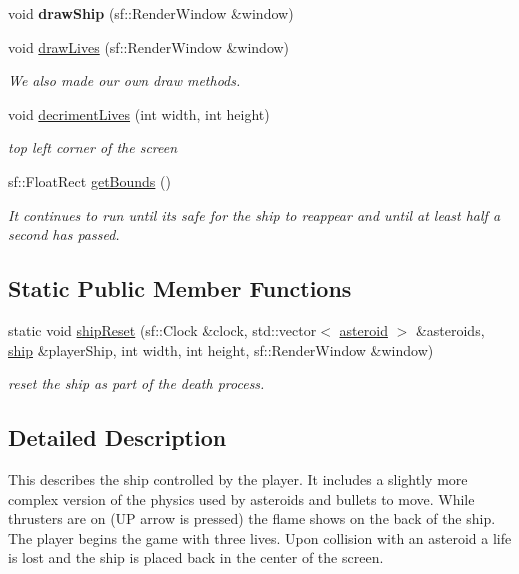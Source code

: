 \begin{DoxyCompactItemize}
\mbox{\label{classship_a48a922eb97d7b0d92c2527c3236d0958}} 
void {\bfseries draw\+Ship} (sf\+::\+Render\+Window \&window)
\item 
\mbox{\label{classship_a99ed337b2360f37a15ddefaac5a5d793}} 
void \hyperlink{classship_a99ed337b2360f37a15ddefaac5a5d793}{draw\+Lives} (sf\+::\+Render\+Window \&window)
\begin{DoxyCompactList}\small\item\em We also made our own draw methods. \end{DoxyCompactList}\item 
void \hyperlink{classship_ad46173638c8514f81e5b100cfa4186a8}{decriment\+Lives} (int width, int height)
\begin{DoxyCompactList}\small\item\em top left corner of the screen \end{DoxyCompactList}\item 
sf\+::\+Float\+Rect \hyperlink{classship_a12077a1e21b72f91054940da28fb5c90}{get\+Bounds} ()
\begin{DoxyCompactList}\small\item\em It continues to run until it\textquotesingle{}s safe for the ship to reappear and until at least half a second has passed. \end{DoxyCompactList}\end{DoxyCompactItemize}
\subsection*{Static Public Member Functions}
\begin{DoxyCompactItemize}
\item 
static void \hyperlink{classship_a3e7fa6b462de7ea41bd3dd2c96d2de56}{ship\+Reset} (sf\+::\+Clock \&clock, std\+::vector$<$ \hyperlink{classasteroid}{asteroid} $>$ \&asteroids, \hyperlink{classship}{ship} \&player\+Ship, int width, int height, sf\+::\+Render\+Window \&window)
\begin{DoxyCompactList}\small\item\em reset the ship as part of the death process. \end{DoxyCompactList}\end{DoxyCompactItemize}


\subsection{Detailed Description}
This describes the ship controlled by the player. It includes a slightly more complex version of the physics used by asteroids and bullets to move. While thrusters are on (UP arrow is pressed) the flame shows on the back of the ship. The player begins the game with three lives. Upon collision with an asteroid a life is lost and the ship is placed back in the center of the screen. 

